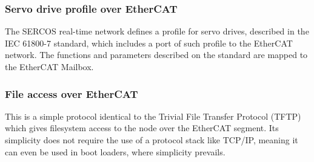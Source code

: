 \subsubsection*{Servo drive profile over EtherCAT}

The SERCOS \texttrademark{} real-time network defines a profile for servo drives, described in the IEC 61800-7 standard, which includes a port of such profile to the EtherCAT network. The functions and parameters described on the standard are mapped to the EtherCAT Mailbox.

\subsubsection*{File access over EtherCAT}

This is a simple protocol identical to the Trivial File Transfer Protocol (TFTP) which gives filesystem access to the node over the EtherCAT segment.
Its simplicity does not require the use of a protocol stack like TCP/IP, meaning it can even be used in boot loaders, where simplicity prevails.
